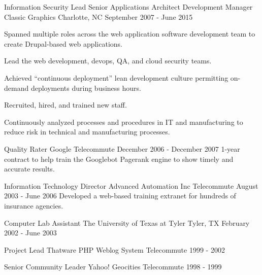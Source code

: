 \begin{cventries}

\cventry
{Information Security Lead \newline {\vspace{-.75mm}}
Senior Applications Architect \newline {\vspace{-.75mm}}
Development Manager}
{Classic Graphics} %
{Charlotte, NC} %
{September 2007 - June 2015} %
{
Spanned multiple roles across the web application software development team to create Drupal-based web applications.
\begin{cvitems}
\item[]
\item {Lead the web development, devops, QA, and cloud security teams.}
\item {Achieved “continuous deployment” lean development culture permitting on-demand deployments during business hours.}
\item {Recruited, hired, and trained new staff.}
\item {Continuously analyzed processes and procedures in IT and manufacturing to reduce risk in technical and manufacturing processes.}
\end{cvitems}
}


\cventry
{Quality Rater}
{Google}
{Telecommute}
{December 2006 - December 2007} %
{ %
1-year contract to help train the Googlebot Pagerank engine to show timely and accurate results.
}


\cventry
{Information Technology Director}
{Advanced Automation Inc}
{Telecommute}
{August 2003 - June 2006} %
{ %
Developed a web-based training extranet for hundreds of insurance agencies.
}


\cventry
{Computer Lab Assistant}
{The University of Texas at Tyler}
{Tyler, TX}
{February 2002 - June 2003} %
{ %
}


\cventry
{Project Lead}
{Thatware PHP Weblog System}
{Telecommute}
{1999 - 2002} %
{ %
}


\cventry
{Senior Community Leader}
{Yahoo! Geocities}
{Telecommute}
{1998 - 1999} %
{ %
}


\end{cventries}
